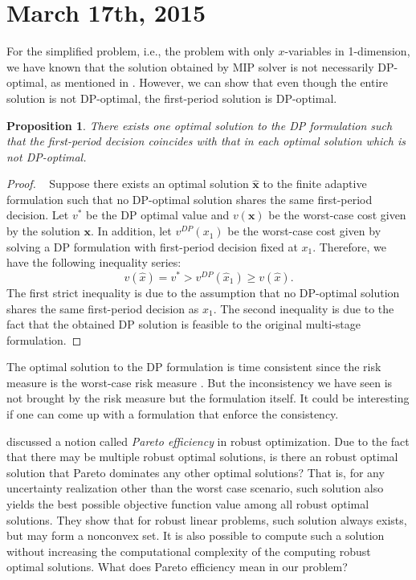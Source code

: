 \documentclass[10pt]{article}
\theoremstyle{plain}
\newtheorem{proposition}{Proposition}
\theoremstyle{definition}
\theoremstyle{remark}
\newcommand{\bx}{\mathbf{x}}
\begin{document}
\section*{March 17th, 2015}
For the simplified problem, i.e., the problem with only $x$-variables in 1-dimension,
we have known that the solution obtained by MIP solver is not necessarily DP-optimal,
as mentioned in \citet{bertsimas2010optimality}. However, we can show that even though
the entire solution is not DP-optimal, the first-period solution is DP-optimal.
\begin{proposition}
	{\color{blue}There exists one optimal solution to the DP formulation such that the first-period decision coincides with that in each optimal solution which is not DP-optimal.}
\end{proposition}
\begin{proof}~
	Suppose there exists an optimal solution $\hat{\bx}$ to the finite adaptive formulation
	such that no DP-optimal solution shares the same first-period decision.
	Let $v^*$ be the DP optimal value and $v(\bx)$ be the worst-case cost given by the
	solution $\bx$. In addition, let $v^{DP}(x_1)$ be the worst-case cost given by solving
	a DP formulation with first-period decision fixed at $x_1$. Therefore,
	we have the following inequality series:
	\[v(\hat{x}) = v^* > v^{DP}(\hat{x}_1) \ge v(\hat{x}).\]
	The first strict inequality is due to the assumption that no DP-optimal solution
	shares the same first-period decision as $\hat{x}_1$. The second inequality is due
	to the fact that the obtained DP solution is feasible to the original multi-stage formulation.
\end{proof}

{\color{red}
	The optimal solution to the DP formulation is time consistent since the risk measure is the worst-case risk measure \citep{shapiro2012time}.
	But the inconsistency we have seen is not brought by the risk measure but the formulation itself. It could be interesting if one can come up with a formulation
	that enforce the consistency.
}

\citet{iancu2013pareto} discussed a notion called \emph{Pareto efficiency} 
in robust optimization. Due to the fact that there may be multiple robust optimal solutions, is there an robust optimal solution that Pareto dominates any other optimal solutions? That is, for any uncertainty realization other than the worst case scenario, such solution also yields
the best possible objective function value among all robust optimal solutions.
They show that for robust linear problems, such solution always exists, but
may form a nonconvex set. It is also possible to compute such a solution
without increasing the computational complexity of the computing robust optimal solutions.
{\color{red}What does Pareto efficiency mean in our problem?}
\end{document}

